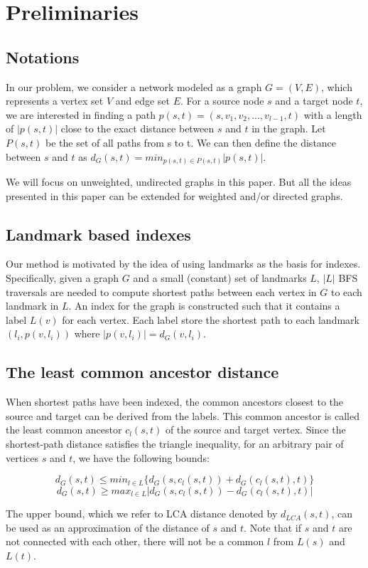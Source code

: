 \section{Preliminaries}
\label{preliminary}

\subsection{Notations}
In our problem, we consider a network modeled as a graph $G = (V,E)$, which represents a vertex set $V$ and edge set $E$. For a source node $s$ and a target node $t$, we are interested in finding a path $p(s,t)=(s,v_1,v_2,...,v_{l-1},t)$ with a length of $|p(s,t)|$ close to the exact distance between $s$ and $t$ in the graph. Let $P(s,t)$ be the set of all paths from s to t. We can then define the distance between $s$ and $t$ as $d_G(s,t) = min_{p(s,t) \in P(s,t)}|p(s,t)|$.

We will focus on unweighted, undirected graphs in this paper. But all the ideas presented in this paper can be extended for weighted and/or directed graphs.

\subsection{Landmark based indexes}

Our method is motivated by the idea of using landmarks as the basis for indexes. Specifically, given a graph $G$ and a small (constant) set of landmarks $L$, $|L|$ BFS traversals are needed to compute shortest paths between each vertex in $G$ to each landmark in $L$. An index for the graph is constructed such that it contains a label $L(v)$ for each vertex. Each label store the shortest path to each landmark $(l_i, p(v,l_i))$ where $|p(v,l_i)| = d_G(v,l_i)$.

\subsection{The least common ancestor distance}

When shortest paths have been indexed, the common ancestors closest to the source and target can be derived from the labels. This common ancestor is called the least common ancestor $c_l(s,t)$ of the source and target vertex. Since the shortest-path distance satisfies the triangle inequality, for an arbitrary pair of vertices $s$ and $t$, we have the following bounds:

\begin{equation}
\label{equ:upper}
    d_G(s,t) \leq min_{l \in L}\{d_G(s,c_l(s,t)) + d_G(c_l(s,t),t)\}
\end{equation}
\begin{equation}
\label{equ:lower}
    d_G(s,t) \geq max_{l \in L}|d_G(s,c_l(s,t)) - d_G(c_l(s,t),t)|
\end{equation}

The upper bound, which we refer to LCA distance denoted by $d_{LCA}(s,t)$, can be used as an approximation of the distance of $s$ and $t$. Note that if $s$ and $t$ are not connected with each other, there will not be a common $l$ from $L(s)$ and $L(t)$.
